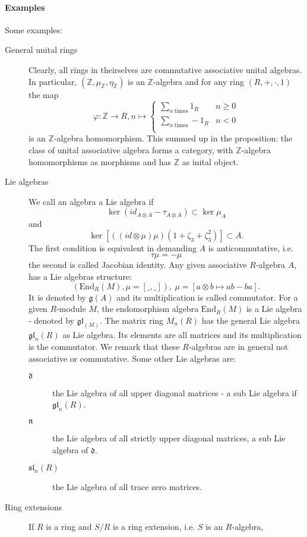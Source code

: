 \documentclass[10pt,a4paper]{article}
\newcommand{\zz}{\mathbb{Z}}
\begin{document}
\paragraph{Examples} Some examples:
\begin{description}
\item[General unital rings] Clearly, all rings in theirselves are commutative associative unital algebras. In particular, $(\zz, \mu_{\zz}, \eta_{\zz})$ is an $\zz$-algebra and for any ring $(R, + , \cdot, 1)$ the
map
$$\varphi : \zz \longrightarrow R, n \longmapsto \begin{cases}
\sum_{n\ \mathrm{times}} 1_R & n \geq 0\\
\sum_{n\ \mathrm{times}} -1_R & n < 0\\
\end{cases}$$
is an $\zz$-algebra homomorphism. This summed up in the proposition: the class of unital associative algebra forms a category, with $\zz$-algebra homomorphisms as morphisms and has $\zz$ as inital object.
\item[Lie algebras] We call an algebra a Lie algebra if
$$\ker (id_{A \otimes A} - \tau_{A \otimes A}) \subset \ker \mu_A$$
and
$$\ker \left[((id \otimes \mu) \mu)(1 + \zeta_3 + \zeta_3^2)\right] \subset A.$$
The first condition is equivalent in demanding $A$ is anticommutative, i.e.
$$\tau \mu = - \mu$$
the second is called Jacobian identity. Any given associative $R$-algebra $A$, has a Lie algebras structure:
$$(\mathrm{End}_R(M), \mu = [\_,\_]),\ \mu = [a \otimes b \longmapsto a b - b a].$$
It is denoted by $\mathfrak{g}(A)$ and its multiplication is called commutator. For a given $R$-module $M$, the endomorphism algebra $\mathrm{End}_R(M)$ is a Lie algebra - denoted by $\mathfrak{gl}_(M)$. The matrix ring $M_n(R)$ has the general Lie algebra $\mathfrak{gl}_n(R)$ as Lie algebra. Its elements are all matrices and its multiplication is the commutator. We remark that these $R$-algebras are in general not associative or commutative. Some other Lie algebras are:
\begin{description}
\item[$\mathfrak{d}$] the Lie algebra of all upper diagonal matrices - a sub Lie algebra if $\mathfrak{gl}_n(R)$.
\item[$\mathfrak{n}$] the Lie algebra of all strictly upper diagonal matrices, a sub Lie algebra of $\mathfrak{d}$.
\item[$\mathfrak{sl}_n(R)$] the Lie algebra of all trace zero matrices.
\end{description}
\item[Ring extensions] If $R$ is a ring and $S/R$ is a ring extension, i.e. $S$ is an $R$-algebra,
\end{description}
\newpage
\end{document}
